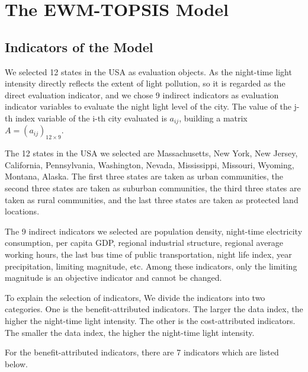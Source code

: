 \section{The EWM-TOPSIS Model}

\subsection{Indicators of the Model}
We selected 12 states in the USA as evaluation objects. As the night-time light intensity directly reflects the extent of light pollution, so it is regarded as the direct evaluation indicator, and we chose 9 indirect indicators as evaluation indicator variables to evaluate the night light level of the city. 
The value of the j-th index variable of the i-th city evaluated is $a_{ij}$, building a matrix $A=(a_{ij})_{12\times9}$.

The 12 states in the USA we selected are Massachusetts, New York, New Jersey, California, Pennsylvania, Washington, Nevada, Mississippi, Missouri, Wyoming, Montana, Alaska. The first three states are taken as urban communities, the second three states are taken as suburban communities, the third three states are taken as rural communities, and the last three states are taken as protected land locations.

The 9 indirect indicators we selected are population density, night-time electricity consumption, per capita GDP, regional industrial structure, regional average working hours, the last bus time of public transportation, night life index, year precipitation, limiting magnitude, etc. Among these indicators, only the limiting magnitude is an objective indicator and cannot be changed.

To explain the selection of indicators, We divide the indicators into two categories. One is the benefit-attributed indicators. The larger the data index, the higher the night-time light intensity. The other is the cost-attributed indicators. The smaller the data index, the higher the night-time light intensity.

For the benefit-attributed indicators, there are 7 indicators which are listed below.


